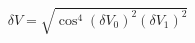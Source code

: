 \begin{equation}
\label{eq:delta_V_Malus}
\delta V = \sqrt{ \cos^4(\delta V_0)^2 (\delta V_1)^2}
\end{equation}